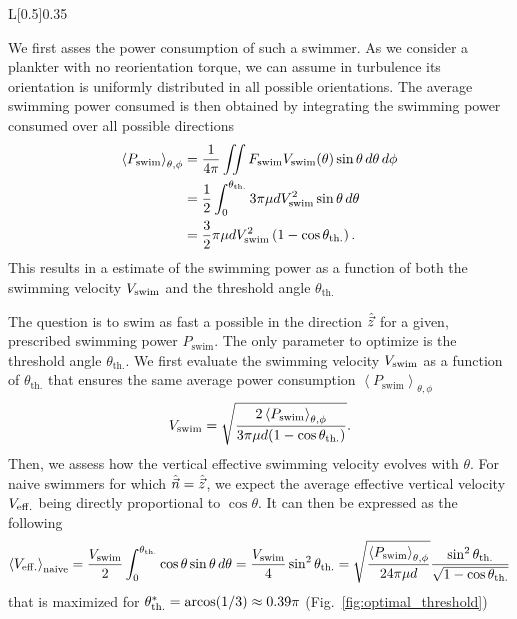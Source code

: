 \begin{wrapfigure}[11]{L}[0.5\width]{0.35\textwidth}
	\centering
	\def\svgwidth{0.3\textwidth}
	
	\captionsetup{width=0.3\textwidth}
  	\caption{Illustration of the optimal threshold angle $\theta_{\mathrm{th.}}^*$.}
  	\label{fig:optimal_threshold}
\end{wrapfigure}
We first asses the power consumption of such a swimmer.
As we consider a plankter with no reorientation torque, we can assume in turbulence its orientation is uniformly distributed in all possible orientations.
The average swimming power consumed is then obtained by integrating the swimming power consumed over all possible directions
\begin{align}
	\left\langle P_{\mathrm{swim}} \right\rangle_{\theta, \phi} &= \frac{1}{4\pi} \iint F_{\mathrm{swim}} V_{\mathrm{swim}}(\theta) \sin \theta \, d\theta \, d\phi \nonumber \\
	&= \frac{1}{2} \int_0^{\theta_{\mathrm{th.}}} 3 \pi \mu d V_{\mathrm{swim}}^2 \sin \theta \, d\theta \nonumber \\
	&= \frac{3}{2} \pi \mu d V_{\mathrm{swim}}^2 \left( 1 - \cos \theta_{\mathrm{th.}} \right).
\end{align}
This results in a estimate of the swimming power as a function of both the swimming velocity $V_{\mathrm{swim}}$ and the threshold angle $\theta_{\mathrm{th.}}$

The question is to swim as fast a possible in the direction $\hat{\vec{z}}$ for a given, prescribed swimming power $P_{\mathrm{swim}}$.
The only parameter to optimize is the threshold angle $\theta_{\mathrm{th.}}$.
We first evaluate the swimming velocity $V_{\mathrm{swim}}$ as a function of $\theta_{\mathrm{th.}}$ that ensures the same average power consumption $\left\langle P_{\mathrm{swim}} \right\rangle_{\theta, \phi}$
\begin{equation}\label{eq:energy_swimming_velocity}
	V_{\mathrm{swim}} =  \sqrt{\frac{2 \left\langle P_{\mathrm{swim}} \right\rangle_{\theta, \phi}}{3 \pi \mu d (1 - \cos \theta_{\mathrm{th.}})}}.
\end{equation} 
Then, we assess how the vertical effective swimming velocity evolves with $\theta$.
For naive swimmers for which $\hat{\vec{n}} = \hat{\vec{z}}$, we expect the average effective vertical velocity $V_{\mathrm{eff.}}$ being directly proportional to $\cos \theta$. 
It can then be expressed as the following
\begin{equation}\label{eq:perf_naive}
	\left\langle V_{\mathrm{eff.}} \right\rangle_{\mathrm{naive}} = \frac{V_{\mathrm{swim}}}{2} \int_0^{\theta_{\mathrm{th.}}} \cos \theta \sin \theta \, d\theta = \frac{V_{\mathrm{swim}}}{4} \sin^2 \theta_{\mathrm{th.}} = \sqrt{\frac{\left\langle P_{\mathrm{swim}} \right\rangle_{\theta, \phi}}{24 \pi \mu d}} \frac{\sin^2 \theta_{\mathrm{th.}}}{\sqrt{1 - \cos \theta_{\mathrm{th.}}}}
\end{equation}
that is maximized for $\theta_{\mathrm{th.}}^* = \operatorname{arcos} (1/3) \approx 0.39 \pi$ (Fig.~\ref{fig:optimal_threshold})

